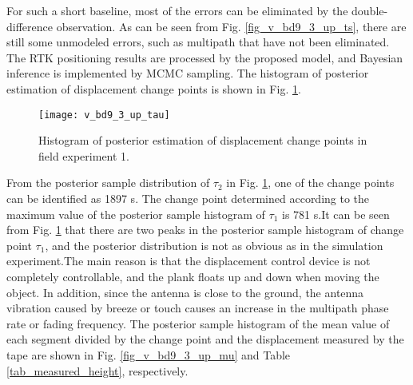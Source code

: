 \documentclass{svjour3}                     %
\begin{document}
For such a short baseline, most of the errors can be eliminated by the double-difference observation. As can be seen from Fig. \ref{fig_v_bd9_3_up_ts}, there are still some unmodeled errors, such as multipath that have not been eliminated. The RTK positioning results are processed by the proposed model, and Bayesian inference is implemented by MCMC sampling. The histogram of posterior estimation of displacement change points is shown in Fig. \ref{fig_v_bd9_3_up_tau}.

\begin{figure}[htbp]
	\centering
	\texttt{[image: v\_bd9\_3\_up\_tau]}
	\caption{Histogram of posterior estimation of displacement change points in field experiment 1.}
	\label{fig_v_bd9_3_up_tau}
\end{figure} 
From the posterior sample distribution of $\tau_2$ in Fig. \ref{fig_v_bd9_3_up_tau}, one of the change points can be identified as 1897 s. The change point determined according to the maximum value of the posterior sample histogram of $\tau_1$ is 781 s.It can be seen from Fig. \ref{fig_v_bd9_3_up_tau} that there are two peaks in the posterior sample histogram of change point $\tau_1$, and the posterior distribution is not as obvious as in the simulation experiment.The main reason is that the displacement control device is not completely controllable, and the plank floats up and down when moving the object. In addition, since the antenna is close to the ground, the antenna vibration caused by breeze or touch causes an increase in the multipath phase rate or fading frequency\citep{teunissen2017springer}. The posterior sample histogram of the mean value of each segment divided by the change point and the displacement measured by the tape are shown in Fig. \ref{fig_v_bd9_3_up_mu} and Table \ref{tab_measured_height}, respectively.
\end{document}
